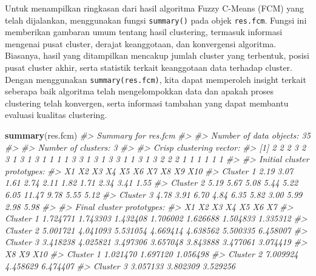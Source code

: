 \documentclass[
  oneside]{book}
\newenvironment{Shaded}{\begin{snugshade}}{\end{snugshade}}
\newcommand{\CommentTok}[1]{\textcolor[rgb]{0.56,0.35,0.01}{\textit{#1}}}
\newcommand{\FunctionTok}[1]{\textcolor[rgb]{0.13,0.29,0.53}{\textbf{#1}}}
\newcommand{\NormalTok}[1]{#1}
\begin{document}
Untuk menampilkan ringkasan dari hasil algoritma Fuzzy C-Means (FCM) yang telah dijalankan, menggunakan fungsi \texttt{summary()} pada objek \texttt{res.fcm}. Fungsi ini memberikan gambaran umum tentang hasil clustering, termasuk informasi mengenai pusat cluster, derajat keanggotaan, dan konvergensi algoritma. Biasanya, hasil yang ditampilkan mencakup jumlah cluster yang terbentuk, posisi pusat cluster akhir, serta statistik terkait keanggotaan data terhadap cluster. Dengan menggunakan \texttt{summary(res.fcm)}, kita dapat memperoleh insight terkait seberapa baik algoritma telah mengelompokkan data dan apakah proses clustering telah konvergen, serta informasi tambahan yang dapat membantu evaluasi kualitas clustering.

\begin{Shaded}
\begin{Highlighting}[]
\FunctionTok{summary}\NormalTok{(res.fcm)}
\CommentTok{\#\textgreater{} Summary for \textquotesingle{}res.fcm\textquotesingle{}}
\CommentTok{\#\textgreater{} }
\CommentTok{\#\textgreater{} Number of data objects:  35 }
\CommentTok{\#\textgreater{} }
\CommentTok{\#\textgreater{} Number of clusters:  3 }
\CommentTok{\#\textgreater{} }
\CommentTok{\#\textgreater{} Crisp clustering vector:}
\CommentTok{\#\textgreater{}  [1] 2 2 2 3 2 3 1 3 1 3 1 1 1 1 3 3 1 3 1 3 3 1 1 3 1 3 2 2 2 1 1 1 1 1 1}
\CommentTok{\#\textgreater{} }
\CommentTok{\#\textgreater{} Initial cluster prototypes:}
\CommentTok{\#\textgreater{}             X1   X2   X3   X4   X5   X6    X7   X8   X9  X10}
\CommentTok{\#\textgreater{} Cluster 1 2.19 3.07 1.61 2.74 2.11 1.82  1.71 2.34 3.41 1.55}
\CommentTok{\#\textgreater{} Cluster 2 5.19 5.67 5.08 5.44 5.22 6.05 11.47 9.78 5.55 5.12}
\CommentTok{\#\textgreater{} Cluster 3 4.78 3.91 6.70 4.84 6.35 5.82  3.00 5.99 2.98 5.98}
\CommentTok{\#\textgreater{} }
\CommentTok{\#\textgreater{} Final cluster prototypes:}
\CommentTok{\#\textgreater{}                 X1       X2       X3       X4       X5       X6       X7}
\CommentTok{\#\textgreater{} Cluster 1 1.724771 1.743303 1.432408 1.706002 1.626688 1.504833 1.335312}
\CommentTok{\#\textgreater{} Cluster 2 5.001721 4.041093 5.531054 4.669414 4.638562 5.500335 6.458007}
\CommentTok{\#\textgreater{} Cluster 3 3.418238 4.025821 3.497306 3.657048 3.843888 3.477061 3.074419}
\CommentTok{\#\textgreater{}                 X8       X9      X10}
\CommentTok{\#\textgreater{} Cluster 1 1.021470 1.697120 1.056498}
\CommentTok{\#\textgreater{} Cluster 2 7.009924 4.458629 6.474407}
\CommentTok{\#\textgreater{} Cluster 3 3.057133 3.802309 3.529256}

\end{Highlighting}
\end{Shaded}
\end{document}
